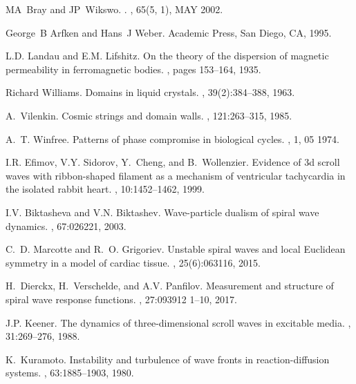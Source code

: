 \documentclass{article}
\begin{document}
\begin{thebibliography}{10}
MA~Bray and JP~Wikswo.
.
, {65}({5, 1}), {MAY} {2002}.

George~B Arfken and Hans~J Weber.
\newblock Academic Press, San Diego, CA, 1995.

L.D. Landau and E.M. Lifshitz.
\newblock On the theory of the dispersion of magnetic permeability in
  ferromagnetic bodies.
, pages 153--164, 1935.

Richard Williams.
\newblock Domains in liquid crystals.
, 39(2):384--388, 1963.

A.~Vilenkin.
\newblock Cosmic strings and domain walls.
, 121:263--315, 1985.

A.~T. Winfree.
\newblock Patterns of phase compromise in biological cycles.
, 1, 05 1974.

I.R. Efimov, V.Y. Sidorov, Y.~Cheng, and B.~Wollenzier.
\newblock Evidence of 3d scroll waves with ribbon-shaped filament as a
  mechanism of ventricular tachycardia in the isolated rabbit heart.
, 10:1452--1462, 1999.

I.V. Biktasheva and V.N. Biktashev.
\newblock Wave-particle dualism of spiral wave dynamics.
, 67:026221, 2003.

C.~D. Marcotte and R.~O. Grigoriev.
\newblock Unstable spiral waves and local {Euclidean} symmetry in a model of
  cardiac tissue.
,
  25(6):063116, 2015.

H.~Dierckx, H.~Verschelde, and A.V. Panfilov.
\newblock Measurement and structure of spiral wave response functions.
, 27:093912 1--10, 2017.

J.P. Keener.
\newblock The dynamics of three-dimensional scroll waves in excitable media.
, 31:269--276, 1988.

K.~Kuramoto.
\newblock Instability and turbulence of wave fronts in reaction-diffusion
  systems.
, 63:1885--1903, 1980.


\end{thebibliography}
\end{document}
